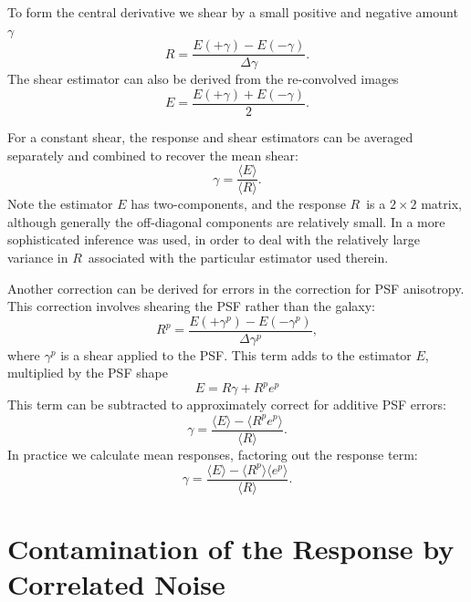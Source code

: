 \documentclass[usegraphicx,usenatbib]{mn2e}
\newcommand{\mcalR}{$R$}
\newcommand{\mcalRpsf}{$R^{p}$}
\begin{document}
To form the central derivative we shear by a small positive and negative
amount $\gamma$
\begin{equation} \label{eq:Rnum}
    R = \frac{E(+\gamma) - E(-\gamma)}{\Delta \gamma}.
\end{equation}
The shear estimator can also be derived from the re-convolved
images
\begin{equation} \label{eq:estimator}
    E = \frac{E(+\gamma) + E(-\gamma)}{2}.
\end{equation}

For a constant shear, the response and shear estimators can be averaged
separately and combined to recover the mean shear:
\begin{equation} \label{eq:basicestimator}
    \gamma = \frac{ \langle E \rangle }{\langle \mbox{\mcalR} \rangle}.
\end{equation}
Note the estimator $E$ has two-components, and the response \mcalR\ is
a $2 \times 2$ matrix, although generally the off-diagonal components
are relatively small.
In \cite{HuffMcal} a more sophisticated inference was used, in order to deal
with the relatively large variance in \mcalR\ associated with the particular
estimator used therein.

Another correction can be derived for errors in the correction for 
PSF anisotropy.  This correction involves shearing the PSF rather
than the galaxy:
\begin{equation}
    \mbox{\mcalRpsf} = \frac{E(+\gamma^{p}) - E(-\gamma^{p})}{\Delta \gamma^{p}},
\end{equation}
where $\gamma^{p}$ is a shear applied to the PSF.  This
term adds to the estimator $E$, multiplied by the PSF shape
\begin{equation}
    E = \mbox{\mcalR} \gamma + \mbox{\mcalRpsf} e^{p} 
\end{equation}
This term can be subtracted to approximately correct for additive PSF errors:
\begin{equation}
    \gamma = \frac{ \langle E \rangle - \langle \mbox{\mcalRpsf} e^{p} \rangle }{\langle \mbox{\mcalR} \rangle}.
\end{equation}
In practice we calculate mean responses, factoring out the response term:
\begin{equation}
    \gamma = \frac{ \langle E \rangle - 
            \langle \mbox{\mcalRpsf}\rangle \langle e^{p} \rangle }{\langle \mbox{\mcalR} \rangle}.
\end{equation}


\section{Contamination of the Response by Correlated Noise} \label{sec:contam}
\end{document}
